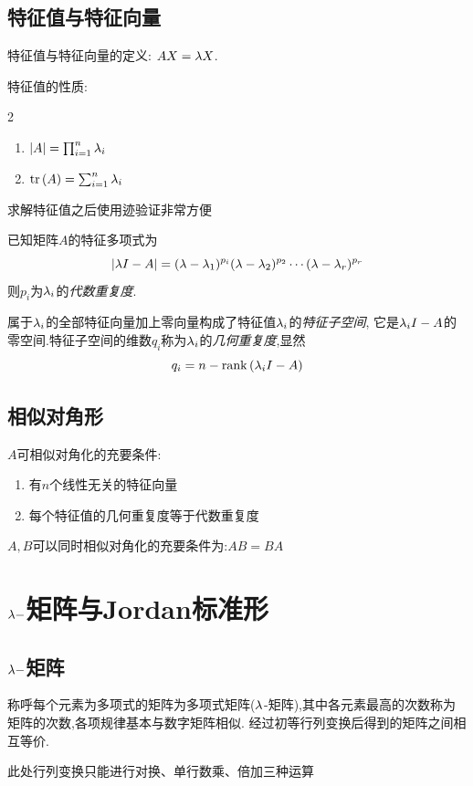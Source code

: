 \documentclass{matrix-review}
\begin{document}
\subsection{\important 特征值与特征向量}\label{subsec:pq}
特征值与特征向量的定义: $AX=\lambda X$.

特征值的性质:
\begin{multicols}{2}
    \begin{enumerate}
        \item $|A| =\prod_{i=1}^{n}\lambda_i$
        \item $\mathrm{tr}\left(A\right) = \sum_{i=1}^{n}\lambda_i$
    \end{enumerate}
\end{multicols}
\begin{remarkbox}
    求解特征值之后使用迹验证非常方便
\end{remarkbox}

已知矩阵$A$的特征多项式为
$$|\lambda I-A|=(\lambda-\lambda_1)^{p_i}(\lambda-\lambda_2)^{p_2}\cdots(\lambda-\lambda_r)^{p_r}$$
则$p_i$为$\lambda_i$的\emph{代数重复度}.

属于$\lambda_i$的全部特征向量加上零向量构成了特征值$\lambda_i$的\emph{特征子空间}, 它是$\lambda_iI-A$的零空间.特征子空间的维数$q_i$称为$\lambda_i$的\emph{几何重复度},显然
$$q_i=n-\mathrm{rank}\left(\lambda_iI-A\right)$$

\subsection{相似对角形}
$A$可相似对角化的充要条件:
\begin{enumerate}
    \item 有$n$个线性无关的特征向量
    \item 每个特征值的几何重复度等于代数重复度
\end{enumerate}

$A,B$可以同时相似对角化的充要条件为:$AB=BA$


\section{\texorpdfstring{$\lambda-$矩阵与Jordan标准形}{lambda-矩阵与Jordan标准形}}

\subsection{\texorpdfstring{$\lambda-$矩阵}{lambda-矩阵}}
称呼每个元素为多项式的矩阵为多项式矩阵($\lambda$-矩阵),其中各元素最高的次数称为矩阵的次数,各项规律基本与数字矩阵相似. 经过初等行列变换后得到的矩阵之间相互等价.
\begin{remarkbox}
    此处行列变换只能进行对换、单行数乘、倍加三种运算
\end{remarkbox}
\end{document}
